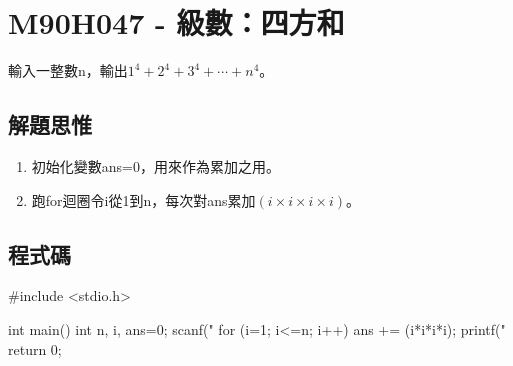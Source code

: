 \section{M90H047 - 級數：四方和}
輸入一整數n，輸出$1^4+2^4+3^4+\cdots+n^4$。
\subsection{解題思惟}
\begin{enumerate}
	\item 初始化變數ans=0，用來作為累加之用。
	\item 跑for迴圈令i從1到n，每次對ans累加$(i\times i\times i\times i)$。
\end{enumerate}
\subsection{程式碼}
\begin{cppcode}
	#include <stdio.h>
	
	int main()
	{
		int n, i, ans=0;
		scanf("%
		for (i=1; i<=n; i++) {
			ans += (i*i*i*i);
		}
		printf("%
		return 0;
	}
	
\end{cppcode}
